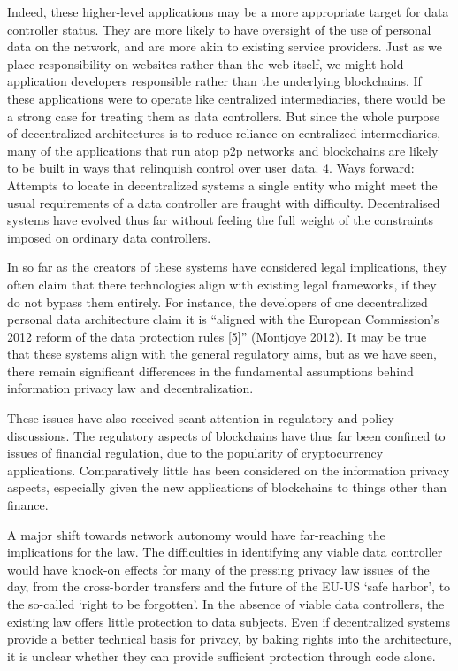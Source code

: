 \documentclass{acm_proc_article-sp}
\begin{document}
Indeed, these higher-level applications may be a more appropriate target for data controller status. They are more likely to have oversight of the use of personal data on the network, and are more akin to existing service providers. Just as we place responsibility on websites rather than the web itself, we might hold application developers responsible rather than the underlying blockchains. If these applications were to operate like centralized intermediaries, there would be a strong case for treating them as data controllers. But since the whole purpose of decentralized architectures is to reduce reliance on centralized intermediaries, many of the applications that run atop p2p networks and blockchains are likely to be built in ways that relinquish control over user data.
4. Ways forward:
Attempts to locate in decentralized systems a single entity who might meet the usual requirements of a data controller are fraught with difficulty. Decentralised systems have evolved thus far without feeling the full weight of the constraints imposed on ordinary data controllers.
 
In so far as the creators of these systems have considered legal implications, they often claim that there technologies align with existing legal frameworks, if they do not bypass them entirely. For instance, the developers of one decentralized personal data architecture claim it is “aligned with the European Commission’s 2012 reform of the data protection rules [5]” (Montjoye 2012). It may be true that these systems align with the general regulatory aims, but as we have seen, there remain significant differences in the fundamental assumptions behind information privacy law and decentralization.
 
These issues have also received scant attention in regulatory and policy discussions. The regulatory aspects of blockchains have thus far been confined to issues of financial regulation, due to the popularity of cryptocurrency applications. Comparatively little has been considered on the information privacy aspects, especially given the new applications of blockchains to things other than finance.
 
A major shift towards network autonomy would have far-reaching the implications for the law. The difficulties in identifying any viable data controller would have knock-on effects for many of the pressing privacy law issues of the day, from the cross-border transfers and the future of the EU-US ‘safe harbor’, to the so-called ‘right to be forgotten’. In the absence of viable data controllers, the existing law offers little protection to data subjects. Even if decentralized systems provide a better technical basis for privacy, by baking rights into the architecture, it is unclear whether they can provide sufficient protection through code alone.
 
\end{document}

